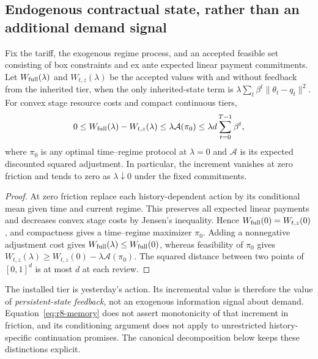 \subsection{Endogenous contractual state, rather than an additional demand signal}
\begin{proposition}\label{prop:r8-memory}
Fix the tariff, the exogenous regime process, and an accepted feasible set consisting of box constraints and ex ante expected linear payment commitments. Let $W_{\rm full}(\lambda)$ and $W_{t,z}(\lambda)$ be the accepted values with and without feedback from the inherited tier, when the only inherited-state term is $\lambda\sum_t\beta^t\|\theta_t-q_t\|^2$. For convex stage resource costs and compact continuous tiers,
\begin{equation}\label{eq:r8-memory}
 0\leq W_{\rm full}(\lambda)-W_{t,z}(\lambda)
 \leq\lambda\mathcal A(\pi_0)
 \leq\lambda d\sum_{t=0}^{T-1}\beta^t,
\end{equation}
where $\pi_0$ is any optimal time--regime protocol at $\lambda=0$ and $\mathcal A$ is its expected discounted squared adjustment. In particular, the increment vanishes at zero friction and tends to zero as $\lambda\downarrow0$ under the fixed commitments.
\end{proposition}
\begin{proof}
At zero friction replace each history-dependent action by its conditional mean given time and current regime. This preserves all expected linear payments and decreases convex stage costs by Jensen's inequality. Hence $W_{\rm full}(0)=W_{t,z}(0)$, and compactness gives a time--regime maximizer $\pi_0$. Adding a nonnegative adjustment cost gives
$W_{\rm full}(\lambda)\leq W_{\rm full}(0)$, whereas feasibility of $\pi_0$ gives
$W_{t,z}(\lambda)\geq W_{t,z}(0)-\lambda\mathcal A(\pi_0)$.
The squared distance between two points of $[0,1]^d$ is at most $d$ at each review.
\end{proof}
The installed tier is yesterday's action. Its incremental value is therefore the value of \emph{persistent-state feedback}, not an exogenous information signal about demand. Equation~\eqref{eq:r8-memory} does not assert monotonicity of that increment in friction, and its conditioning argument does not apply to unrestricted history-specific continuation promises. The canonical decomposition below keeps these distinctions explicit.

